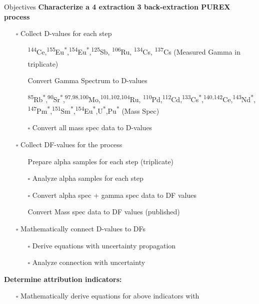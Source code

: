 \documentclass{beamer}
\newcommand{\tss}{\textsuperscript}
\newcommand{\cmark}{\ding{51}}%
\newcommand{\done}{\rlap{$\square$}{\raisebox{2pt}{\large\hspace{1pt}\cmark}}%
  \hspace{-2.5pt}}
\newcommand{\notdone}{$\square$}
\begin{document}
\begin{frame}[allowframebreaks]{Objectives}
\vspace{-0.7cm}
\textbf{\small Characterize a 4 extraction 3 back-extraction PUREX process}
\begin{itemize}
\item[\notdone]{Collect D-values for each step}
  \begin{itemize}
  \item[\tiny\done]{\tiny \tss{144}Ce,\tss{155}Eu\tss{*},\tss{154}Eu\tss{*},\tss{125}Sb,
    \tss{106}Ru, \tss{134}Cs, \tss{137}Cs
    (Measured Gamma in triplicate)\tss{\cite{chirayath2015trace}}}
  \item[\tiny\done]{\tiny Convert Gamma Spectrum to D-values}
  \item[\tiny\done]{\tiny \tss{85}Rb\tss{*},\tss{90}Sr\tss{*},\tss{97,98,100}Mo,\tss{101,102,104}Ru,
    \tss{110}Pd,\tss{112}Cd,\tss{133}Cs\tss{*},\tss{140,142}Ce,\tss{143}Nd\tss{*},
    \tss{147}Pm\tss{*},\tss{151}Sm\tss{*},\tss{154}Eu\tss{*},U\tss{*},Pu\tss{*} (Mass Spec)}
  \item[\tiny\notdone]{\tiny Convert all mass spec data to D-values}
  \end{itemize}
\item[\notdone]{Collect DF-values for the process}
  \begin{itemize}
  \item[\tiny\done]{\tiny Prepare alpha samples for each step (triplicate)}
  \item[\tiny\notdone]{\tiny Analyze alpha samples for each step}
  \item[\tiny\notdone]{\tiny Convert alpha spec + gamma spec data to DF values}
  \item[\tiny\done]{\tiny Convert Mass spec data to DF values (published)}
  \end{itemize}
\item[\notdone]{Mathematically connect D-values to DFs}
  \begin{itemize}
  \item[\tiny\notdone]{\tiny Derive equations with uncertainty propagation}
  \item[\tiny\notdone]{\tiny Analyze connection with uncertainty}
  \end{itemize}
\end{itemize}
\framebreak
\vspace*{-1cm}
\textbf{\small Determine attribution indicators:}
\begin{itemize}
\item[\notdone]{\small Mathematically derive equations for above indicators with
}
\end{itemize}
\end{frame}
\end{document}
